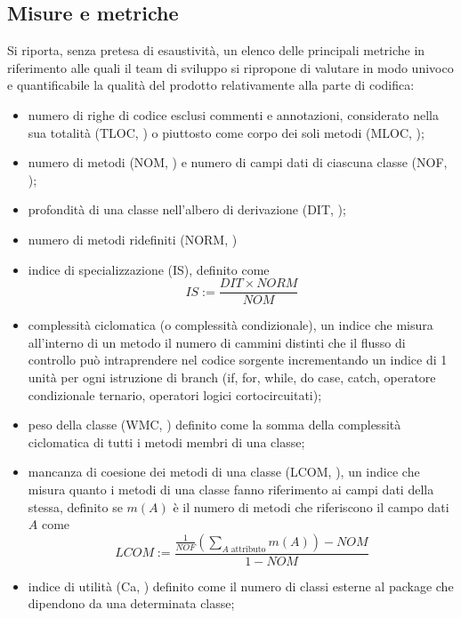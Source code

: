 \subsection{Misure e metriche}\label{sec:metrics}
Si riporta, senza pretesa di esaustività, un elenco delle principali metriche in riferimento alle quali il team di sviluppo si ripropone di valutare in modo univoco e quantificabile la qualità del prodotto relativamente alla parte di codifica:

\begin{itemize}
  \item numero di righe di codice esclusi commenti e annotazioni, considerato nella sua totalità (TLOC, ) o piuttosto come corpo dei soli metodi (MLOC, );
  \item numero di metodi (NOM, ) e numero di campi dati di ciascuna classe (NOF, );
  \item profondità di una classe nell'albero di derivazione (DIT, );
  \item numero di metodi ridefiniti (NORM, )
  \item indice di specializzazione (IS), definito come \[
  IS := \frac{DIT \times NORM}{NOM}
  \]
  \item complessità ciclomatica (o complessità condizionale), un indice che misura all'interno di un metodo il numero di cammini distinti che il flusso di controllo può intraprendere nel codice sorgente incrementando un indice di 1 unità per ogni istruzione di branch (if, for, while, do case, catch, operatore condizionale ternario, operatori logici cortocircuitati);
  \item peso della classe (WMC, ) definito come la somma della complessità ciclomatica di tutti i metodi membri di una classe;
  \item mancanza di coesione dei metodi di una classe (LCOM, ), un indice che misura quanto i metodi di una classe fanno riferimento ai campi dati della stessa, definito se $m(A)$ è il numero di metodi che riferiscono il campo dati $A$ come \[
  LCOM := \frac{\frac{1}{NOF}\left(\displaystyle\sum_{A\;\mathrm{attributo}}{m(A)}\right) - NOM}{1-NOM}
  \]
  \item indice di utilità (Ca, ) definito come il numero di classi esterne al package che dipendono da una determinata classe;

\end{itemize}
